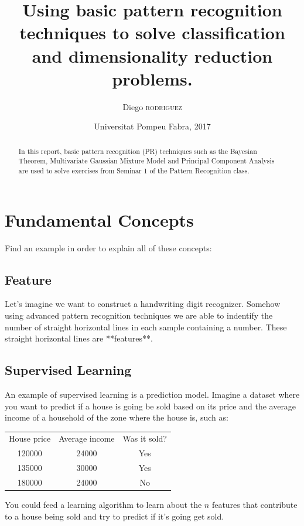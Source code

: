 \documentclass[]{article}
\date{Universitat Pompeu Fabra, 2017}
\title{Using basic pattern recognition techniques to solve classification and dimensionality reduction problems.}
\author{Diego \textsc{rodriguez}}
\begin{document}
\maketitle

\begin{abstract}
In this report, basic pattern recognition (PR) techniques such as the Bayesian Theorem, Multivariate Gaussian Mixture Model and Principal Component Analysis are used to solve exercises from Seminar 1 of the Pattern Recognition class.
\end{abstract}

\section{Fundamental Concepts}

Find an example in order to explain all of these concepts:

\subsection{Feature}

Let's imagine we want to construct a handwriting digit recognizer. Somehow using advanced pattern recognition techniques we are able to indentify the number of straight horizontal lines in each sample containing a number. These straight horizontal lines are **features**.

\subsection{Supervised Learning}

An example of supervised learning is a prediction model. Imagine a dataset where you want to predict if a house is going be sold based on its price and the average income of a household of the zone where the house is, such as:

\begin{center}
\begin{tabular}{c | c | c}
	House price & Average income & Was it sold?\\
	120000      & 24000 		 & Yes\\
	135000		& 30000			 & Yes\\
	180000		& 24000			 & No\\
\end{tabular}
\end{center}

You could feed a learning algorithm to learn about the $n$ features that contribute to a house being sold and try to predict if it's going get sold.
\end{document}
